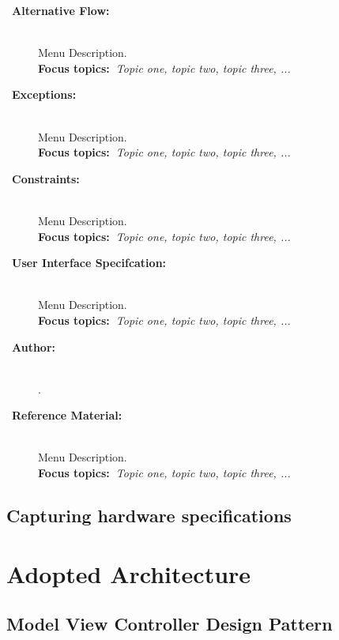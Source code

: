 \begin{description}
      \item[~\bfseries Alternative Flow:] \hfill \\%
            Menu Description.~\\%
            {\textbf{Focus topics:~}\emph{Topic one, topic two, topic three, ...}}%
      \item[~\bfseries Exceptions:] \hfill \\%
            Menu Description.~\\%
            {\textbf{Focus topics:~}\emph{Topic one, topic two, topic three, ...}}%
      \item[~\bfseries Constraints:] \hfill \\%
            Menu Description.~\\%
            {\textbf{Focus topics:~}\emph{Topic one, topic two, topic three, ...}}%
      \item[~\bfseries User Interface Specifcation:] \hfill \\%
            Menu Description.~\\%
            {\textbf{Focus topics:~}\emph{Topic one, topic two, topic three, ...}}%
      \item[~\bfseries Author:] \hfill \\%
            \reportAuthor{}.~\\%
      \item[~\bfseries Reference Material:] \hfill \\%
            Menu Description.~\\%
            {\textbf{Focus topics:~}\emph{Topic one, topic two, topic three, ...}}%

\end{description}



\subsection{Capturing hardware specifications}


\section{Adopted Architecture}

\subsection{Model View Controller Design Pattern}

